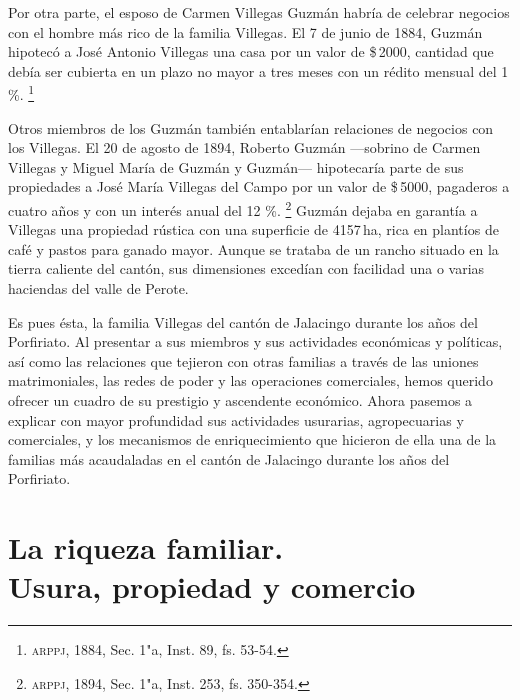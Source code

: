 \documentclass[14pt,twoside,final]{extbook} %
\let\oldfootnote\footnote
\renewcommand\footnote[1]{%
\oldfootnote{\hspace{1mm}#1}}
\begin{document}
Por otra parte, el esposo de Carmen Villegas Guzmán habría de celebrar negocios con el hombre más rico de la familia Villegas. El 7 de junio de 1884, Guzmán hipotecó a José Antonio Villegas una casa por un valor de \$\,2000, cantidad que debía ser cubierta en un plazo no mayor a tres meses con un rédito mensual del 1 \%.\footnote{\textsc{arppj}, 1884, Sec. 1"a, Inst. 89, fs. 53-54.}

Otros miembros de los Guzmán también entablarían relaciones de negocios con los Villegas. El 20 de agosto de 1894, Roberto Guzmán ---sobrino de Carmen Villegas y Miguel María de Guzmán y Guzmán--- hipotecaría parte de sus propiedades a José María Villegas del Campo por un valor de \$\,5000, pagaderos a cuatro años y con un interés anual del 12 \%.\footnote{\textsc{arppj}, 1894, Sec. 1"a, Inst. 253, fs. 350-354.} Guzmán dejaba en garantía a Villegas una propiedad rústica con una superficie de 4157\,ha, rica en plantíos de café y pastos para ganado mayor. Aunque se trataba de un rancho situado en la tierra caliente del cantón, sus dimensiones excedían con facilidad una o varias haciendas del valle de Perote.

Es pues ésta, la familia Villegas del cantón de Jalacingo durante los años del Porfiriato. Al presentar a sus miembros y sus actividades económicas y políticas, así como las relaciones que tejieron con otras familias a través de las uniones matrimoniales, las redes de poder y las operaciones comerciales, hemos querido ofrecer un cuadro de su prestigio y ascendente económico. Ahora pasemos a explicar con mayor profundidad sus actividades usurarias, agropecuarias y comerciales, y los mecanismos de enriquecimiento que hicieron de ella una de la familias más acaudaladas en el cantón de Jalacingo durante los años del Porfiriato.
\chapter[La riqueza familiar. Usura, propiedad y comercio]{La riqueza familiar. \\ Usura, propiedad y comercio}\label{ch:capitulo-tres}
\thispagestyle{empty}
\pagestyle{fancy}
\fancyhf{} %
\fancyhead[RO,LE]{\iffloatpage{}{\thepage}}
\renewcommand\headrulewidth{\iffloatpage{0pt}{0pt}}
\setcounter{page}{89}
\end{document}
